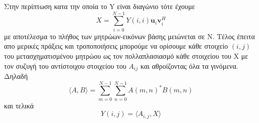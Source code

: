 \hspace*{\fill}\newline
\newline
Στην περίπτωση κατα την οποία το Y είναι διαγώνιο τότε έχουμε \\
\newline\hspace*{\fill}
\begin{equation}
        Χ = \sum_{i=0}^{N-1} Y(i,i)\mathbf{u}_{i}\mathbf{v}_{i}^{H}
\end{equation}
\hspace*{\fill}\newline
\newline
με αποτέλεσμα το πλήθος των μητρώων-εικόνων βάσης μειώνεται σε Ν. Τέλος έπειτα απο μερικές πράξεις και τροποποιήσεις μπορούμε να ορίσουμε κάθε στοιχείο $(i,j)$ του μετασχηματισμένου μητρώου ως τον πολλαπλασιασμό κάθε στοιχείου του Χ με τον συζυγή του αντίστοιχου στοιχείου του $Α_{ij}$ και αθροίζοντας όλα τα γινόμενα. Δηλαδή
\newline\hspace*{\fill}
\begin{equation}
        \langle A,B \rangle = \sum_{m=0}^{N-1} \sum_{n=0}^{N-1} A(m,n)^{*}B(m,n)
\end{equation}
\hspace*{\fill}\newline
και τελικά
\newline\hspace*{\fill}
\begin{equation}
        Y(i,j) = \langle A_{i,j},X \rangle
\end{equation}
\hspace*{\fill}\newline

